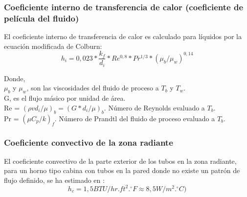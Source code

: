 \subsubsection{Coeficiente interno de transferencia de calor (coeficiente de película del fluido)}
\par El coeficiente interno de transferencia de calor es calculado para líquidos por la ecuación modificada de Colburn:
\begin{equation}
\label{eq:hi}
 h_i = 0,023 * \frac{k_f}{d_i} *Re^{0,8} *Pr^{1/3} *(\mu_b /\mu_w )^{0,14}
\end{equation}
\par Donde,\\
$\mu_b$ y $\mu_w$, son las viscosidades del fluido de proceso a $T_b$ y $T_w$. \\
G, es el flujo másico por unidad de área. \\
Re = $(\rho v d_i / \mu)_b = (G *d_i / \mu)_b$. Número de Reynolds evaluado a $T_b$.\\
Pr = $(\mu C_p / k)_f$. Número de Prandtl del fluido de proceso evaluado a $T_b$.

\subsubsection{Coeficiente convectivo de la zona radiante}
\par El coeficiente convectivo de la parte exterior de los tubos en la zona radiante, para un horno tipo cabina con tubos en la pared donde no existe un patrón de flujo definido, se ha estimado en \cite{sirios}:
\begin{equation}
h_{c} = 1,5 BTU/hr.ft^2.^{\circ}F \approx 8,5 W/m^2.^{\circ}C)
\end{equation}

